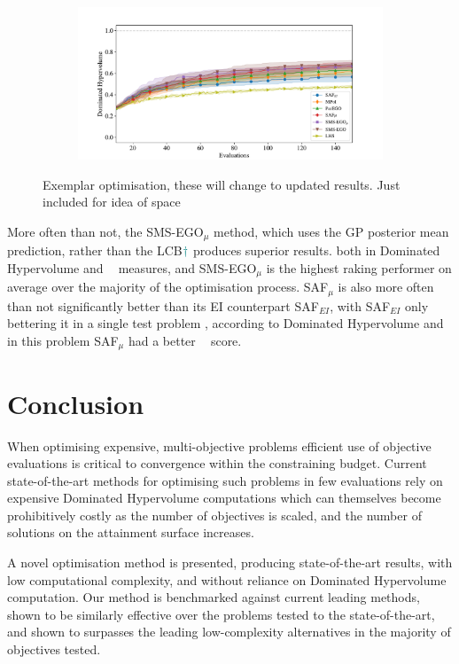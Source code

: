 \documentclass[conference]{IEEEtran}
\DeclareMathOperator*{\igdp}{IGD^{+}}
\newcommand\hpv{Dominated Hypervolume\xspace}
\newcommand\safmu{SAF$_{\mu}$\xspace}
\newcommand\safei{SAF$_{EI}$\xspace}
\newcommand\smsegomu{SMS-EGO$_{\mu}$\xspace}
\newcommand\ei{EI\xspace}
\newcommand\gp{GP\xspace}
\newcommand{\fnote}[2][\textcolor{teal}{\dagger}]{$#1$\marginpar{\color{teal}\raggedright\tiny$#1$
    #2}}
\begin{document}
\begin{figure}[t]
\begin{subfigure}[b]{0.45\columnwidth}
         \caption{}
         \label{fig: exemplar_pf_safmu_saf}
     \end{subfigure}
\begin{subfigure}[b]{\columnwidth}
         \centering
         \includegraphics[width=\columnwidth]{figures/wfg5_3obj_8dim_hv_plot.pdf}
         \caption{}
         \label{fig: exemplar_pf_sms_saf_hv}
     \end{subfigure}
\caption{Exemplar optimisation, these will change to updated results. Just included for idea of space}
\label{fig: exemplar_pf}
\end{figure}

More often than not, the \smsegomu method, which uses the \gp posterior mean prediction, rather than the LCB\fnote{needs defining in \ref{section:related_work}} produces superior results. both in \hpv and $\igdp$ measures, and \smsegomu is the highest raking performer on average over the majority of the optimisation process. \safmu is also more often than not significantly better than its \ei counterpart \safei, with \safei only bettering it in a single test problem , according to \hpv and in this problem \safmu had a better $\igdp$ score.  


\section{Conclusion}
\label{sec:conclusion}
When optimising expensive, multi-objective problems efficient use of objective evaluations is critical to convergence within the constraining budget. Current state-of-the-art methods for optimising such problems in few evaluations rely on expensive \hpv computations which can themselves become prohibitively costly as the number of objectives is scaled, and the number of solutions on the attainment surface increases. 

A novel optimisation method is presented, producing state-of-the-art results, with low computational complexity, and without reliance on \hpv computation. Our method is benchmarked against current leading methods, shown to be similarly effective over the problems tested to the state-of-the-art, and shown to surpasses the leading low-complexity alternatives in the majority of objectives tested. 
\end{document}
